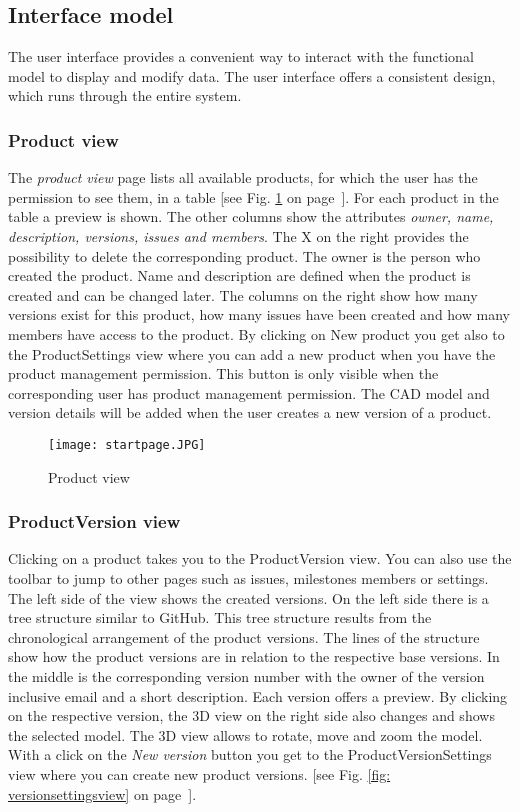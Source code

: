\subsection{Interface model}

The user interface provides a convenient way to interact with the functional model to display and modify data. The user interface offers a consistent design, which runs through the entire system.

\subsubsection*{Product view}

The \textit{product view} page lists all available products, for which the user has the permission to see them, in a table [see Fig. \ref{fig: startpage} on page~\pageref{fig: startpage}]. For each product in the table a preview is shown. The other columns show the attributes \textit{owner, name, description, versions, issues and members}. The X on the right provides the possibility to delete the corresponding product. The owner is the person who created the product. Name and description are defined when the product is created and can be changed later. The columns on the right show how many versions exist for this product, how many issues have been created and how many members have access to the product. By clicking on New product you get also to the ProductSettings view where you can add a new product when you have the product management permission. This button is only visible when the corresponding user has product management permission. The CAD model and version details will be added when the user creates a new version of a product.

\begin{figure}[h]
    \centering
    \texttt{[image: startpage.JPG]}
    \caption{Product view}
    \label{fig: startpage}
\end{figure}

\subsubsection*{ProductVersion view}

Clicking on a product takes you to the ProductVersion view. You can also use the toolbar to jump to other pages such as issues, milestones members or settings. The left side of the view shows the created versions. On the left side there is a tree structure similar to GitHub. This tree structure results from the chronological arrangement of the product versions. The lines of the structure show how the product versions are in relation to the respective base versions. In the middle is the corresponding version number with the owner of the version inclusive email and a short description. Each version offers a preview. By clicking on the respective version, the 3D view on the right side also changes and shows the selected model. The 3D view allows to rotate, move and zoom the model. 
With a click on the \textit{New version} button you get to the ProductVersionSettings view where you can create new product versions. [see Fig. \ref{fig: versionsettingsview} on page~\pageref{fig: versionsettingsview}]. 

